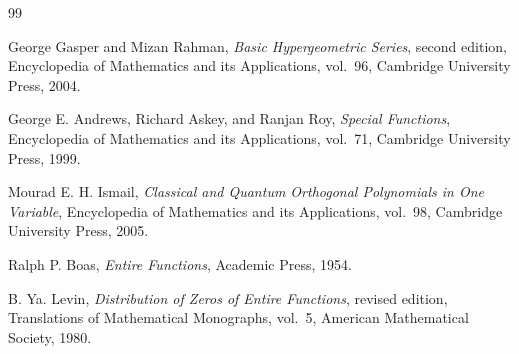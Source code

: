 \documentclass[11pt]{article}
\theoremstyle{definition}
\begin{document}
\begin{thebibliography}{99}

George Gasper and Mizan Rahman,
\emph{Basic Hypergeometric Series}, second edition,
Encyclopedia of Mathematics and its Applications, vol.~96,
Cambridge University Press, 2004.

George E. Andrews, Richard Askey, and Ranjan Roy,
\emph{Special Functions},
Encyclopedia of Mathematics and its Applications, vol.~71,
Cambridge University Press, 1999.

Mourad E. H. Ismail,
\emph{Classical and Quantum Orthogonal Polynomials in One Variable},
Encyclopedia of Mathematics and its Applications, vol.~98,
Cambridge University Press, 2005.

Ralph P. Boas,
\emph{Entire Functions},
Academic Press, 1954.

B. Ya. Levin,
\emph{Distribution of Zeros of Entire Functions},
revised edition, Translations of Mathematical Monographs, vol.~5,
American Mathematical Society, 1980.

\end{thebibliography}
\end{document}
